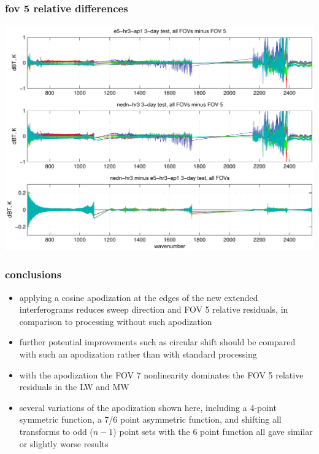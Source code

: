 \documentclass[11pt]{beamer}
\begin{document}
\begin{frame}
\frametitle{fov 5 relative differences}
\begin{center}
  \includegraphics[scale=0.5]{figures/rel_summary.pdf}
\end{center}
\end{frame}
\begin{frame}
\frametitle{conclusions}

\begin{itemize}

  \item applying a cosine apodization at the edges of the new
    extended interferograms reduces sweep direction and FOV 5
    relative residuals, in comparison to processing without such
    apodization

  \item further potential improvements such as circular shift should
    be compared with such an apodization rather than with standard
    processing

  \item with the apodization the FOV 7 nonlinearity dominates the
    FOV 5 relative residuals in the LW and MW

  \item several variations of the apodization shown here, including
    a 4-point symmetric function, a 7/6 point asymmetric function,
    and shifting all transforms to odd ($n-1$) point sets with the 6
    point function all gave similar or slightly worse results

\end{itemize}

\end{frame}
\end{document}
